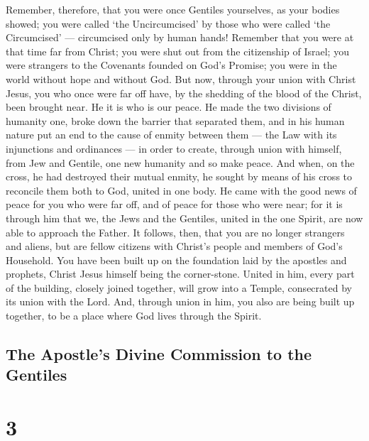  Remember, therefore, that you were once Gentiles
yourselves, as your bodies showed; you were called `the Uncircumcised'
by those who were called `the Circumcised' --- circumcised only by human
hands!  Remember that you were at that time far from
Christ; you were shut out from the citizenship of Israel; you were
strangers to the Covenants founded on God's Promise; you were in the
world without hope and without God.  But now, through your
union with Christ Jesus, you who once were far off have, by the shedding
of the blood of the Christ, been brought near.  He it is
who is our peace. He made the two divisions of humanity one, broke down
the barrier that separated them,  and in his human nature
put an end to the cause of enmity between them --- the Law with its
injunctions and ordinances --- in order to create, through union with
himself, from Jew and Gentile, one new humanity and so make peace.
 And when, on the cross, he had destroyed their mutual
enmity, he sought by means of his cross to reconcile them both to God,
united in one body.  He came with the good news of peace
for you who were far off, and of peace for those who were near;
 for it is through him that we, the Jews and the Gentiles,
united in the one Spirit, are now able to approach the Father.
 It follows, then, that you are no longer strangers and
aliens, but are fellow citizens with Christ's people and members of
God's Household.  You have been built up on the foundation
laid by the apostles and prophets, Christ Jesus himself being the
corner-stone.  United in him, every part of the building,
closely joined together, will grow into a Temple, consecrated by its
union with the Lord.  And, through union in him, you also
are being built up together, to be a place where God lives through the
Spirit.

\hypertarget{the-apostles-divine-commission-to-the-gentiles}{%
\subsection{The Apostle's Divine Commission to the
Gentiles}\label{the-apostles-divine-commission-to-the-gentiles}}

\hypertarget{section-2}{%
\section{3}\label{section-2}}

